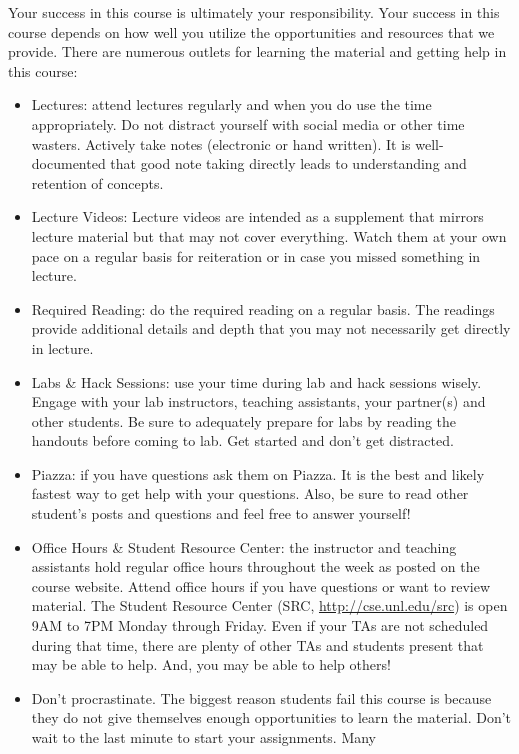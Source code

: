 \documentclass[12pt]{scrartcl}
\begin{document}
Your success in this course is ultimately your responsibility.  Your
success in this course depends on how well you utilize the opportunities
and resources that we provide.  There are numerous outlets for learning
the material and getting help in this course:
\begin{itemize}
  \item Lectures: attend lectures regularly and when you do use the 
  time appropriately.  Do not distract yourself with social media or other
  time wasters.  Actively take notes (electronic or hand written).  It is
  well-documented that good note taking directly leads to understanding and
  retention of concepts.
  \item Lecture Videos: Lecture videos are intended as a supplement
  that mirrors lecture material but that may not cover everything.  Watch
  them at your own pace on a regular basis for reiteration or in case
  you missed something in lecture.  
  \item Required Reading: do the required reading on a regular basis.  The
  readings provide additional details and depth that you may not necessarily
  get directly in lecture.  
  \item Labs \& Hack Sessions: use your time during lab and hack sessions 
  wisely.  Engage with your lab instructors, teaching assistants, your partner(s)
  and other students.  Be sure to adequately prepare for labs by reading
  the handouts before coming to lab.  Get started and don't get distracted.
  \item Piazza: if you have questions ask them on Piazza.  It is the best and
  likely fastest way to get help with your questions.  Also, be sure to read
  other student's posts and questions and feel free to answer yourself!
  \item Office Hours \& Student Resource Center: the instructor and teaching
  assistants hold regular office hours throughout the week as posted on the
  course website.  Attend office hours if you have questions or want to 
  review material.  The Student Resource Center (SRC, \url{http://cse.unl.edu/src})
  is open 9AM to 7PM Monday through Friday.  Even if your TAs are not scheduled
  during that time, there are plenty of other TAs and students present that
  may be able to help.  And, you may be able to help others!
  \item Don't procrastinate.  The biggest reason students fail this course
  is because they do not give themselves enough opportunities to learn the
  material.  Don't wait to the last minute to start your assignments.  Many

\end{itemize}
\end{document}
